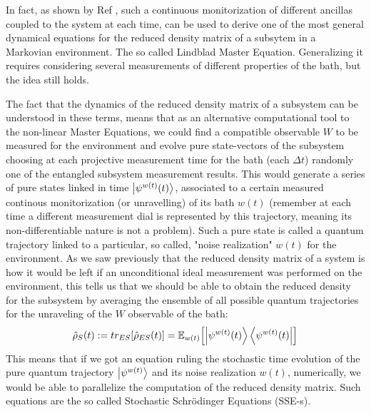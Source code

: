 \documentclass[11pt, a4paper]{article} %
\begin{document}
In fact, as shown by Ref \cite{continousMeas}, such a continuous monitorization of different ancillas coupled to the system at each time, can be used to derive one of the most general dynamical equations for the reduced density matrix of a subsytem in a Markovian environment. The so called Lindblad Master Equation. Generalizing it requires considering several measurements of different properties of the bath, but the idea still holds.

The fact that the dynamics of the reduced density matrix of a subsystem can be understood in these terms, means that as an alternative computational tool to the non-linear Master Equations, we could find a compatible observable $W$ to be measured for the environment and evolve pure state-vectors of the subsystem choosing at each projective measurement time for the bath (each $\Delta t$) randomly one of the entangled subsystem measurement results. This would generate a series of pure states linked in time $\ket{\psi^{w(t)}(t)}$, associated to a certain measured continous monitorization (or unravelling) of its bath $w(t)$ (remember at each time a different measurement dial is represented by this trajectory, meaning its non-differentiable nature is not a problem). Such a pure state is called a quantum trajectory linked to a particular, so called, "noise realization" $w(t)$ for the environment. As we saw previously that the reduced density matrix of a system is how it would be left if an unconditional ideal measurement was performed on the environment, this tells us that we should be able to obtain the reduced density for the subsystem by averaging the ensemble of all possible quantum trajectories for the unraveling of the $W$ observable of the bath:
\begin{equation}
\hat{\rho}_S(t):=tr_{ES}[\hat{\rho}_{ES}(t)]=\mathbb{E}_{w(t)}\qty[\ket{\psi^{w(t)}(t)}\bra{\psi^{w(t)}(t)}]
\end{equation}
This means that if we got an equation ruling the stochastic time evolution of the pure quantum trajectory $\ket{\psi^{w(t)}}$ and its noise realization $w(t)$, numerically, we would be able to parallelize the computation of the reduced density matrix. Such equations are the so called Stochastic Schrödinger Equations (SSE-s).
\end{document}

